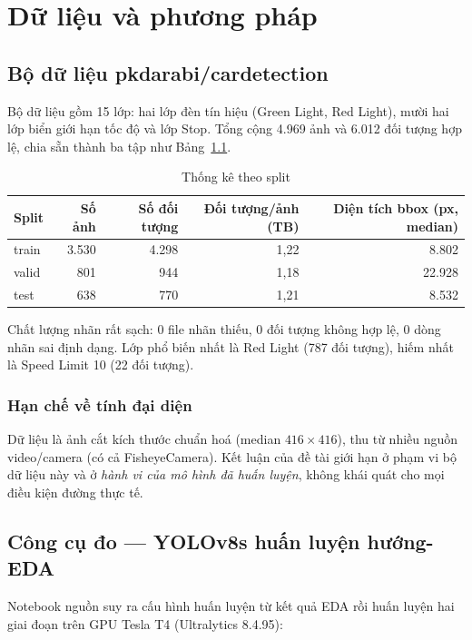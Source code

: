 \chapter{Dữ liệu và phương pháp}
\label{ch:phuongphap}

\section{Bộ dữ liệu pkdarabi/cardetection}

Bộ dữ liệu gồm 15 lớp: hai lớp đèn tín hiệu (Green Light, Red Light), mười hai lớp biển giới hạn
tốc độ và lớp Stop. Tổng cộng 4.969 ảnh và 6.012 đối tượng hợp lệ, chia sẵn thành ba tập như
Bảng~\ref{tab:split}.

\begin{table}[H]
\centering
\caption{Thống kê theo split}
\label{tab:split}
\small
\begin{tabular}{lrrrr}
\toprule
\textbf{Split} & \textbf{Số ảnh} & \textbf{Số đối tượng} & \textbf{Đối tượng/ảnh (TB)}
& \textbf{Diện tích bbox (px, median)} \\
\midrule
train & 3.530 & 4.298 & 1,22 & 8.802 \\
valid &   801 &   944 & 1,18 & 22.928 \\
test  &   638 &   770 & 1,21 & 8.532 \\
\bottomrule
\end{tabular}
\end{table}

Chất lượng nhãn rất sạch: 0 file nhãn thiếu, 0 đối tượng không hợp lệ, 0 dòng nhãn sai định dạng.
Lớp phổ biến nhất là Red Light (787 đối tượng), hiếm nhất là Speed Limit 10 (22 đối tượng).

\subsection{Hạn chế về tính đại diện}

Dữ liệu là ảnh cắt kích thước chuẩn hoá (median $416\times416$), thu từ nhiều nguồn video/camera
(có cả FisheyeCamera). Kết luận của đề tài giới hạn ở phạm vi bộ dữ liệu này và ở \emph{hành vi
của mô hình đã huấn luyện}, không khái quát cho mọi điều kiện đường thực tế.

\section{Công cụ đo --- YOLOv8s huấn luyện hướng-EDA}

Notebook nguồn suy ra cấu hình huấn luyện từ kết quả EDA rồi huấn luyện hai giai đoạn trên GPU
Tesla T4 (Ultralytics 8.4.95):

